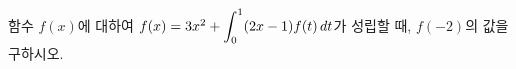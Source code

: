 함수 $f(x)$에 대하여 $f(x)=3x^2+\displaystyle\int_{0}^{1}(2x-1)f(t)\mkern3mu dt$가 성립할 때, $f(-2)$의 값을 구하시오.
